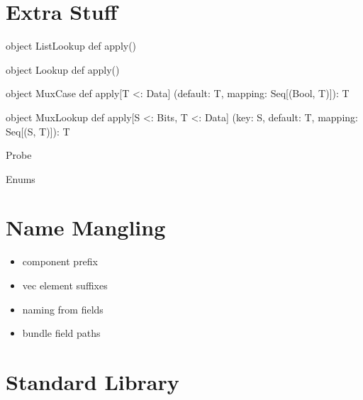 \documentclass[10pt,twocolumn]{article}
\begin{document}
\section{Extra Stuff}

\lstset{language=scala}

\begin{scala}
object ListLookup {
  def apply()
}

object Lookup {
  def apply()
}

object MuxCase {
  def apply[T <: Data] 
    (default: T, mapping: Seq[(Bool, T)]): T
}

object MuxLookup {
  def apply[S <: Bits, T <: Data] 
    (key: S, default: T, mapping: Seq[(S, T)]): T
}
\end{scala}

\begin{scala}
Probe
\end{scala}

\begin{scala}
Enums
\end{scala}

\section{Name Mangling}

\begin{itemize}
\item component prefix
\item vec element suffixes
\item naming from fields
\item bundle field paths
\end{itemize}

\section{Standard Library}
\end{document}
